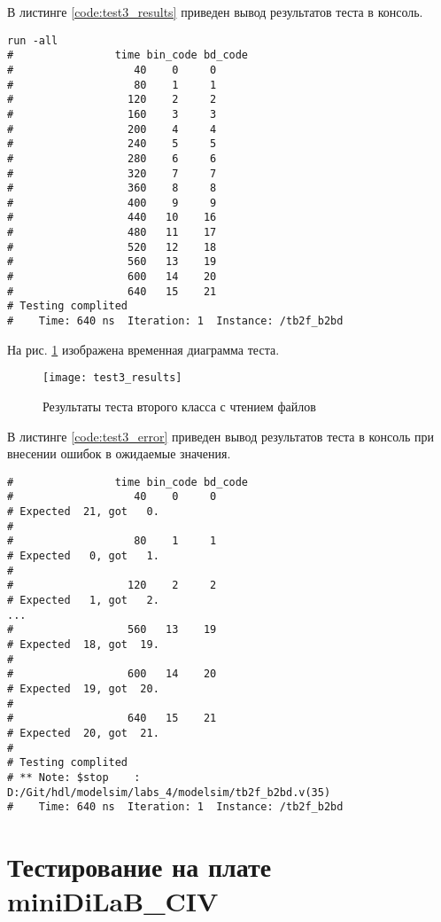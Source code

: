 В листинге \ref{code:test3_results} приведен вывод результатов теста в консоль.
\begin{lstlisting}[caption=Результаты теста второго класса с чтением файлов, label=code:test3_results, language={}]
run -all
# 		         time bin_code bd_code
#                   40    0     0
#                   80    1     1
#                  120    2     2
#                  160    3     3
#                  200    4     4
#                  240    5     5
#                  280    6     6
#                  320    7     7
#                  360    8     8
#                  400    9     9
#                  440   10    16
#                  480   11    17
#                  520   12    18
#                  560   13    19
#                  600   14    20
#                  640   15    21
# Testing complited
#    Time: 640 ns  Iteration: 1  Instance: /tb2f_b2bd
\end{lstlisting}

На рис. \ref{fig:test3_results} изображена временная диаграмма теста.
\begin{figure}[H]
	\begin{center}
		\texttt{[image: test3\_results]}
		\caption{Результаты теста второго класса с чтением файлов}
		\label{fig:test3_results}
	\end{center}
\end{figure}

В листинге \ref{code:test3_error} приведен вывод результатов теста в консоль при внесении ошибок в ожидаемые значения.
\begin{lstlisting}[caption=Результаты ошибочного теста второго класса с чтением файлов, label=code:test3_error, style=console]
# 		         time bin_code bd_code
#                   40    0     0
# Expected  21, got   0.
# 
#                   80    1     1
# Expected   0, got   1.
# 
#                  120    2     2
# Expected   1, got   2.
...
#                  560   13    19
# Expected  18, got  19.
# 
#                  600   14    20
# Expected  19, got  20.
# 
#                  640   15    21
# Expected  20, got  21.
# 
# Testing complited
# ** Note: $stop    : D:/Git/hdl/modelsim/labs_4/modelsim/tb2f_b2bd.v(35)
#    Time: 640 ns  Iteration: 1  Instance: /tb2f_b2bd
\end{lstlisting}

\section{Тестирование на плате miniDiLaB\_CIV}

